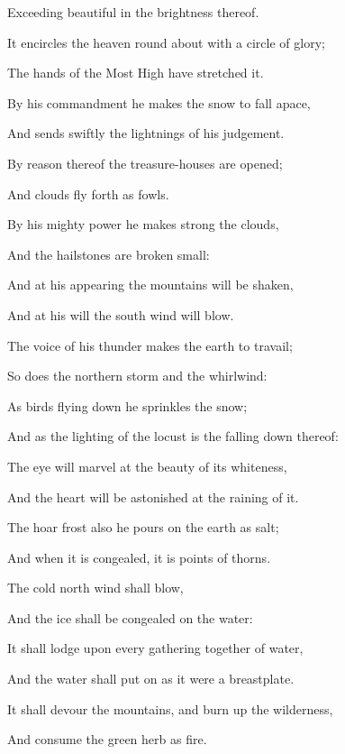 {\par }{\Q Exceeding beautiful in the brightness thereof.
\par }{\Q {}It encircles the heaven round about with a circle of glory;
\par }{\Q The hands of the Most High have stretched it.
\par }{\BB \par }{\Q {}By his commandment he makes the snow to fall apace,
\par }{\Q And sends swiftly the lightnings of his judgement.
\par }{\Q {}By reason thereof the treasure-houses are opened;
\par }{\Q And clouds fly forth as fowls.
\par }{\Q {}By his mighty power he makes strong the clouds,
\par }{\Q And the hailstones are broken small:
\par }{\Q {}And at his appearing the mountains will be shaken,
\par }{\Q And at his will the south wind will blow.
\par }{\Q {}The voice of his thunder makes the earth to travail;
\par }{\Q So does the northern storm and the whirlwind:
\par }{\Q As birds flying down he sprinkles the snow;
\par }{\Q And as the lighting of the locust is the falling down thereof:
\par }{\Q {}The eye will marvel at the beauty of its whiteness,
\par }{\Q And the heart will be astonished at the raining of it.
\par }{\Q {}The hoar frost also he pours on the earth as salt;
\par }{\Q And when it is congealed, it is
{} points of thorns.
\par }{\BB \par }{\Q {}The cold north wind shall blow,
\par }{\Q And the ice shall be congealed on the water:
\par }{\Q It shall lodge upon every gathering together of water,
\par }{\Q And the water shall put on as it were a breastplate.
\par }{\Q {}It shall devour the mountains, and burn up the wilderness,
\par }{\Q And consume the green herb as fire.
}
